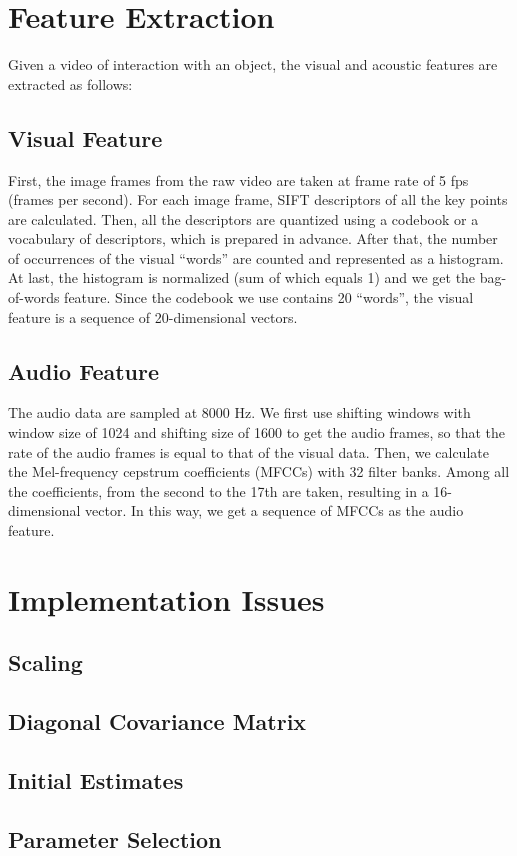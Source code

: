 \documentclass[12pt,final,twoside]{report}
\theoremstyle{plain}
\theoremstyle{definition}
\theoremstyle{remark}
\begin{document}
\section{Feature Extraction}
Given a video of interaction with an object, the visual and acoustic features are extracted as follows:
\subsection{Visual Feature}
First, the image frames from the raw video are taken at frame rate of 5 fps (frames per second). For each image frame, SIFT descriptors of all the key points are calculated. Then, all the descriptors are quantized using a codebook or a vocabulary of descriptors, which is prepared in advance. After that, the number of occurrences of the visual ``words'' are counted and represented as a histogram. At last, the histogram is normalized (sum of which equals 1) and we get the bag-of-words feature. Since the codebook we use contains 20 ``words'', the visual feature is a sequence of 20-dimensional vectors.

\subsection{Audio Feature}
The audio data are sampled at 8000 Hz. We first use shifting windows with window size of 1024 and shifting size of 1600 to get the audio frames, so that the rate of the audio frames is equal to that of the visual data. Then, we calculate the Mel-frequency cepstrum coefficients (MFCCs) with 32 filter banks. Among all the coefficients, from the second to the 17th are taken, resulting in a 16-dimensional vector. In this way, we get a sequence of MFCCs as the audio feature.


\section{Implementation Issues}
\subsection{Scaling}
\subsection{Diagonal Covariance Matrix}
\subsection{Initial Estimates}
\subsection{Parameter Selection}
\end{document}
